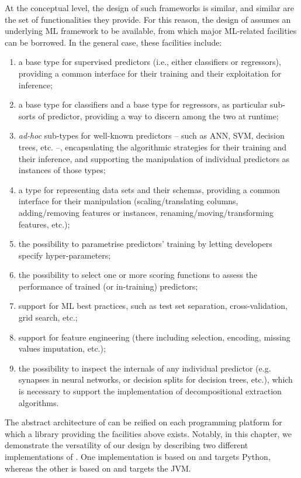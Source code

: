 \documentclass[12pt,a4paper,openright,twoside]{book}
\begin{document}
At the conceptual level, the design of such frameworks is similar, and similar are the set of functionalities they provide.
%
For this reason, the design of \psyke{} assumes an underlying ML framework to be available, from which major ML-related facilities can be borrowed.
%
In the general case, these facilities include:
%
\begin{enumerate}[label=\textbf{F\arabic{*}}]
    \item\label{facility:predictor-type} a base type for supervised predictors (i.e., either classifiers or regressors), providing a common interface for their training and their exploitation for inference;
    \item\label{facility:classifier-regressor-types} a base type for classifiers and a base type for regressors, as particular sub-sorts of predictor, providing a way to discern among the two at runtime;
    \item\label{facility:specific-predictor-types} \emph{ad-hoc} sub-types for well-known predictors -- such as ANN, SVM, decision trees, etc. --, encapsulating the algorithmic strategies for their training and their inference, and supporting the manipulation of individual predictors as instances of those types;
    \item\label{facility:dataset-schema-types} a type for representing data sets and their schemas, providing a common interface for their manipulation (scaling/translating columns, adding/removing features or instances, renaming/moving/transforming features, etc.);
    \item\label{facility:parametrisation} the possibility to parametrise predictors' training by letting developers specify hyper-parameters;
    \item\label{facility:scoring} the possibility to select one or more scoring functions to assess the performance of trained (or in-training) predictors;
    \item\label{facility:best-practices} support for ML best practices, such as test set separation, cross-validation, grid search, etc.;
    \item\label{facility:feature-engineering} support for feature engineering (there including selection, encoding, missing values imputation, etc.);
    \item\label{facility:inspection} the possibility to inspect the internals of any individual predictor (e.g. synapses in neural networks, or decision splits for decision trees, etc.), which is necessary to support the implementation of decompositional extraction algorithms.
\end{enumerate}
%
The abstract architecture of \psyke{} can be reified on each programming platform for which a library providing the facilities above exists.
%
Notably, in this chapter, we demonstrate the versatility of our design by describing two different implementations of \psyke{}.
%
One implementation is based on \scikit{} and targets Python, whereas the other is based on \smile{} and targets the JVM.
\end{document}
